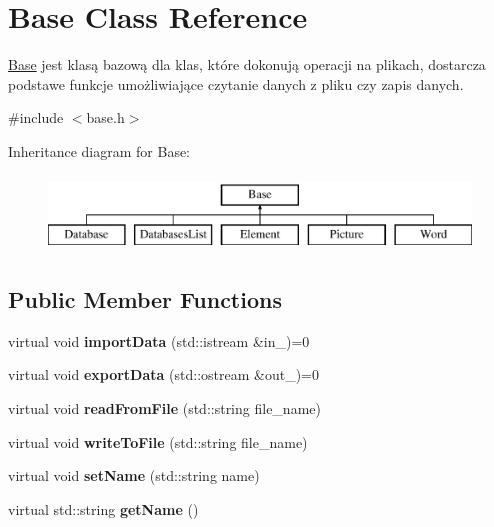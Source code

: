 \hypertarget{class_base}{}\section{Base Class Reference}
\label{class_base}


\mbox{\hyperlink{class_base}{Base}} jest klasą bazową dla klas, które dokonują operacji na plikach, dostarcza podstawe funkcje umożliwiające czytanie danych z pliku czy zapis danych.  




{\ttfamily \#include $<$base.\+h$>$}

Inheritance diagram for Base\+:\begin{figure}[H]
\begin{center}
\leavevmode
\includegraphics[height=2.000000cm]{class_base}
\end{center}
\end{figure}
\subsection*{Public Member Functions}
\begin{DoxyCompactItemize}
\item 
\mbox{\label{class_base_a7b4b21d52b3d3247744e0ee1e4f63586}} 
virtual void {\bfseries import\+Data} (std\+::istream \&in\+\_\+)=0
\item 
\mbox{\label{class_base_a88840038845318752f245aeec2ea4a68}} 
virtual void {\bfseries export\+Data} (std\+::ostream \&out\+\_\+)=0
\item 
\mbox{\label{class_base_ac414e12b727e044fd3a56ca6d8c1d4e6}} 
virtual void {\bfseries read\+From\+File} (std\+::string file\+\_\+name)
\item 
\mbox{\label{class_base_ae878e796ec7e77f33ebee2048f961551}} 
virtual void {\bfseries write\+To\+File} (std\+::string file\+\_\+name)
\item 
\mbox{\label{class_base_a4d31c87adaa91feaecf96d09825caacc}} 
virtual void {\bfseries set\+Name} (std\+::string name)
\item 
\mbox{\label{class_base_abc24d7d976d415e2facc4e2d2cc0730d}} 
virtual std\+::string {\bfseries get\+Name} ()
\end{DoxyCompactItemize}
